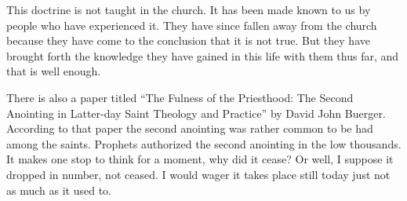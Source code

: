  This doctrine is not taught in the church. It has been made known to us by 
 people who have experienced it. They have since fallen away from the church 
 because they have come to the conclusion that it is not true. But they have 
 brought forth the knowledge they have gained in this life with them thus far, 
 and that is well enough.

 There is also a paper titled “The Fulness of the Priesthood: The Second 
 Anointing in Latter-day Saint Theology and Practice” by David John Buerger. 
 According to that paper the second anointing was rather common to be had among 
 the saints. Prophets authorized the second anointing in the low thousands. It 
 makes one stop to think for a moment, why did it cease? Or well, I suppose it 
 dropped in number, not ceased. I would wager it takes place still today just 
 not as much as it used to.